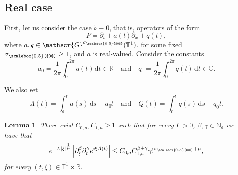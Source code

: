 \documentclass[11pt,reqno]{amsart}
\numberwithin{equation}{section}
\newtheorem{lemma}[theorem]{Lemma}
\theoremstyle{definition}
\theoremstyle{definition}
\newcommand{\T}{\mathbb{T}}
\newcommand{\R}{\mathbb{R}}
\newcommand{\N}{\mathbb{N}}
\newcommand{\sigmac}{\sigma_{\scalebox{0.5}{$0$}}}
\begin{document}
\subsection{Real case} First, let us consider the case $b\equiv 0$, that is, operators of the form
\[P=\partial_t+a(t)\partial_x+q(t),\]
where $a,q\in\mathscr{G}^{\sigmac}(\T^1)$, for some fixed $\sigmac\geq 1$, and $a$ is real-valued. Consider the constants
\[a_0=\dfrac{1}{2\pi}\int_{0}^{2\pi}a(t)\,\mathrm{d}t\in\R\quad\text{and}\quad q_0=\dfrac{1}{2\pi}\int_0^{2\pi}q(t)\,\mathrm{d}t\in\mathbb{C}.\]

We also set
\[A(t)=\int_0^t a(s)\,\mathrm{d}s - a_0t\quad\text{and}\quad Q(t)= \int_0^t q(s)\,\mathrm{d}s - q_0t. \]

\begin{lemma}\label{lemma_ca}
There exist $C_{0,a},C_{1,a}\geq 1$ such that for every $L>0$, $\beta,\gamma\in\N_0$ we have that
    \begin{equation}\label{est_ca}
        e^{-L|\xi|^{\frac{1}{\mu}}}\left|\partial_\xi^\beta\partial_t^\gamma e^{i\xi A(t)}\right|\leq   C_{0,a} C_{1,a}^{\beta+\gamma} \gamma!^{\sigmac+\mu},
    \end{equation}
    for every $(t,\xi)\in\T^1\times\R$.
\end{lemma}
\end{document}
